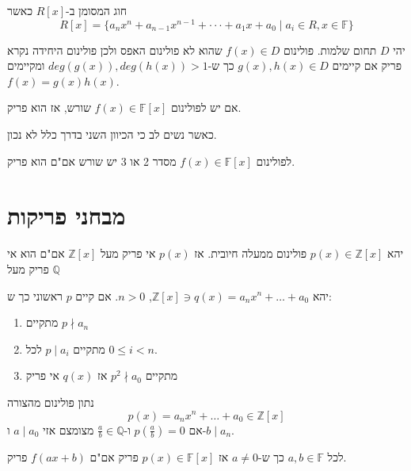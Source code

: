 \documentclass{tstextbook}
\begin{document}
\begin{definition}
חוג המסומן ב-\(R[x]\) כאשר 
$$R[x]=\{a_{n}x^{n}+a_{n-1}x^{n-1}+\cdot\cdot\cdot+a_{1}x+a_{0}\mid a_{i}\in R, x \in \mathbb{F} \} $$

\end{definition}
\begin{definition}
יהי \(D\) תחום שלמות. פולינום \(f(x)\in D\) שהוא לא פולינום האפס ולכן פולינום היחידה נקרא פריק אם קיימים \(g(x),h(x)\in D\) כך ש-\(deg(g(x)),deg(h(x))>1\) ומקיימים \(f(x)=g(x)h(x)\).

\end{definition}
\begin{proposition}
אם יש לפולינום \(f(x)\in \mathbb{F}[x]\) שורש, אז הוא פריק. 

\end{proposition}
כאשר נשים לב כי הכיוון השני בדרך כלל לא נכון.

\begin{proposition}
לפולינום \(f(x)\in \mathbb{F}[x]\) מסדר 2 או 3 יש שורש אם"ם הוא פריק.

\end{proposition}
\section{מבחני פריקות}

\begin{proposition}
יהא \(p(x)\in \mathbb{Z}[x]\) פולינום ממעלה חיובית. אז \(p(x)\) אי פריק מעל \(\mathbb{Z}[x]\) אם"ם הוא אי פריק מעל \(\mathbb{Q}\)

\end{proposition}
\begin{proposition}
יהא \(\mathbb{Z}[x]\ni q(x)=a_{n}x^n+\dots+a_{0}\), \(n>0\).
אם קיים \(p\) ראשוני כך ש:

  \begin{enumerate}
    \item מתקיים \(p\nmid a_n\)


    \item מתקיים \(p\mid a_{i}\) לכל \(0\leq i<n\). 


    \item מתקיים \(p^2 \nmid a_{0}\) 
אז \(q(x)\) אי פריק


  \end{enumerate}
\end{proposition}
\begin{proposition}
נתון פולינום מהצורה $$p(x)=a_{n}x^{n}+\ldots+a_{0}\in\mathbb{Z}[x]$$ אם \(p\left( \frac{a}{b} \right)=0\) ו-\(\frac{a}{b}\in \mathbb{ Q}\) מצומצם אזי \(a\mid a_{0}\) ו-\(b\mid a_{n}\).

\end{proposition}
\begin{proposition}
לכל \(a,b \in \mathbb{F}\) כך ש-\(a\neq 0\) אז \(p(x) \in \mathbb{F} [x]\) פריק אם"ם \(f(ax+b)\) פריק.

\end{proposition}
\end{document}
